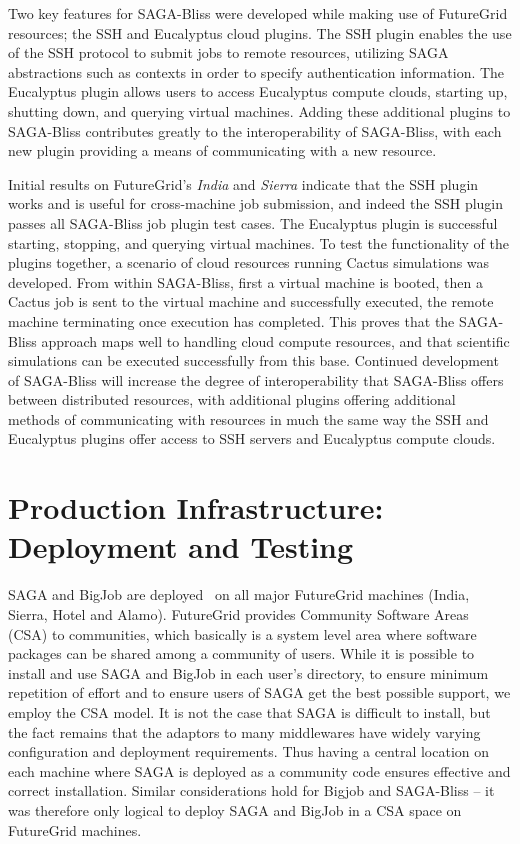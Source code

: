 \documentclass[]{paper}
\begin{document}
Two key features for SAGA-Bliss were developed while making use of FutureGrid resources; the SSH and Eucalyptus cloud plugins.  The SSH plugin enables the use of the SSH protocol to submit jobs to remote resources, utilizing SAGA abstractions such as contexts in order to specify authentication information.  The Eucalyptus plugin allows users to access Eucalyptus compute clouds, starting up, shutting down, and querying virtual machines.  Adding these additional plugins to SAGA-Bliss contributes greatly to the interoperability of SAGA-Bliss, with each new plugin providing a means of communicating with a new resource.

Initial results on FutureGrid's \textit{India} and \textit{Sierra} indicate
that the SSH plugin works and is useful for cross-machine job submission, and
indeed the SSH plugin passes all SAGA-Bliss job plugin test cases.  The
Eucalyptus plugin is successful starting, stopping, and querying virtual
machines.  To test the functionality of the plugins together, a scenario of
cloud resources running Cactus simulations was developed.  From within
SAGA-Bliss, first a virtual machine is booted, then a Cactus job is sent to the
virtual machine and successfully executed, the remote machine terminating once
execution has completed.  This proves that the SAGA-Bliss approach maps well to
handling cloud compute resources, and that scientific simulations can be
executed successfully from this base.  Continued development of SAGA-Bliss will
increase the degree of interoperability that SAGA-Bliss offers between
distributed resources, with additional plugins offering additional methods of
communicating with resources in much the same way the SSH and Eucalyptus
plugins offer access to SSH servers and Eucalyptus compute clouds.


\section{Production Infrastructure: Deployment and Testing}

SAGA and BigJob are deployed~\cite{saga-depl} on all major FutureGrid machines (India, Sierra, Hotel and Alamo).  FutureGrid provides Community Software Areas (CSA) to communities, which basically is a system level area where software packages can be shared among a community of users.  While it is possible to install and use SAGA and BigJob in each user's directory, to ensure minimum repetition of effort and to ensure users of SAGA get the best possible support, we employ the CSA model.  It is not the case that SAGA is difficult to install, but the fact remains that the adaptors to many middlewares have widely varying configuration and deployment requirements.  Thus having a central location on each machine where SAGA is deployed as a community code ensures effective and correct installation.  Similar considerations hold for Bigjob and SAGA-Bliss -- it was therefore only logical to deploy SAGA and BigJob in a CSA space on FutureGrid machines.
\end{document}
